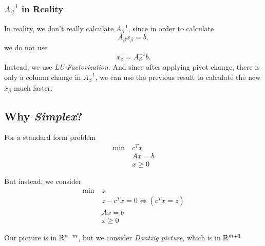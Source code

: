 \subsubsection{\(A_{\beta}^{-1}\) in Reality}
\begin{note}
	In reality, we don't really calculate \(A^{-1}_{\beta}\), since in order to calculate
	\[
		A_{\beta}x_{\beta} = b,
	\]
	we do not use
	\[
		\overline{x}_{\beta} = A^{-1}_{\beta}b.
	\]
	Instead, we use \emph{LU-Factorization}. And since after applying pivot change,
	there is only a column change in \(A^{-1}_{\beta}\), we can use the previous result
	to calculate the new \(\overline{x}_{\beta}\) much faster.
\end{note}

\subsection{Why \emph{Simplex}?}
For a standard form problem
\begin{align*}
	\min~ & c^Tx    \\
	      & Ax = b  \\
	      & x\geq 0
\end{align*}

But instead, we consider
\begin{align*}
	\min~ & z                                  \\
	      & z - c^{T} x = 0 \iff (c^{T} x = z) \\
	      & Ax = b                             \\
	      & x\geq 0
\end{align*}

\begin{prev}
	Our picture is in \(\mathbb{\MakeUppercase{R}}^{n-m}\), but we consider \emph{Dantzig picture}, which is in \(\mathbb{\MakeUppercase{R}}^{m+1}\)
\end{prev}

